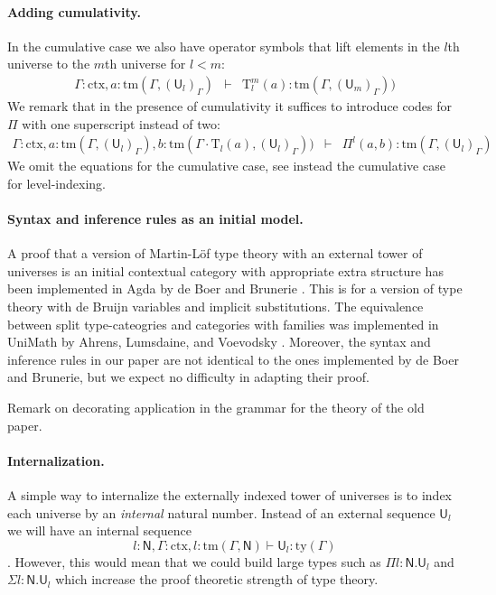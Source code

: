 \documentclass[11pt,a4paper]{article}
\theoremstyle{definition}
\newcommand{\UU}{\mathsf{U}}
\def\UU{\mathsf{U}}
\newcommand{\N}{\mathsf{N}}
\def\Pihat{\Pi}
\newcommand{\ctx}{\mathrm{ctx}}
\newcommand{\ty}{\mathrm{ty}}
\newcommand{\tm}{\mathrm{tm}}
\def\U{\mathsf{U}}
\newcommand{\Ta}{\mathrm{T}}
\begin{document}
\paragraph{Adding cumulativity.}
In the cumulative case we also have operator symbols that lift elements in the $l$th universe to the $m$th universe for $l < m$:
\begin{eqnarray*}
\Gamma : \ctx, a : \tm(\Gamma,(\U_{l})_\Gamma) &\vdash& {\Ta^m_{l}}(a) : \tm(\Gamma,(\U_{m})_\Gamma))
\end{eqnarray*}
We remark that in the presence of cumulativity it suffices to introduce codes for $\Pi$ with one superscript instead of two:
\begin{eqnarray*}
\Gamma : \ctx,
a : \tm(\Gamma,(\U_{l})_\Gamma),
b :  \tm(\Gamma \cdot \Ta_{l}(a), (\U_{l})_\Gamma))
&\vdash&
 \Pihat^{l}(a,b) : \tm(\Gamma,(\U_{l})_\Gamma)
 \end{eqnarray*}
 We omit the equations for the cumulative case, see instead the cumulative case for level-indexing.

\paragraph{Syntax and inference rules as an initial model.} A proof that a version of Martin-Löf type theory with an external tower of universes  is an initial contextual category with appropriate extra structure has been implemented in Agda by de Boer and Brunerie \cite{Brunerie:initiality,deBoer:lic}. This is for a version of type theory with de Bruijn variables and implicit substitutions. The equivalence between split type-cateogries and categories with families was implemented in UniMath by Ahrens, Lumsdaine, and Voevodsky \cite{AhrensLV18}. Moreover, the syntax and inference rules in our paper \cite{BezemCDE22} are not identical to the ones implemented by de Boer and Brunerie, but we expect no difficulty in adapting their proof.

Remark on decorating application in the grammar for the theory of the old paper.

\paragraph{Internalization.}
A simple way to internalize the externally indexed tower of universes is to index each universe by an {\em internal} natural number. Instead of an external sequence $\UU_l$ we will have an internal sequence 
$$l : \N, \Gamma : \ctx, l : \tm(\Gamma,\N) \vdash \UU_l : \ty(\Gamma)$$. 
However, this would mean that we could build large types such as $\Pi l : \N.\U_l$ and $\Sigma l : \N.\U_l$ which increase the proof theoretic strength of type theory. 
\end{document}

